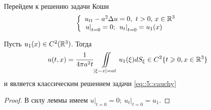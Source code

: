 \documentclass[../main.tex]{subfiles}
\begin{document}
Перейдем к решению задачи Коши
\begin{equation}
\left\{
  \begin{array}{ll}
  u_{tt}-a^2\Delta u=0,\ t>0,\, x\in \mathbb{R}^3\\
  \left. u\right|_{t=0}=0;\ \left. u_t\right|_{t=0}=u_1(x)
  \end{array}
\right.
\label{eq::5::cauchy}
\end{equation}
\begin{theorem}
Пусть $u_1(x)\in C^2(\mathbb{R}^3)$. Тогда 
\[
u(t,x)=\frac{1}{4\pi a^2t}\iint\limits_{|\xi - x|=at}u_1(\xi )dS_{\xi}\in C^2\{t\geqslant 0, x\in \mathbb{R}^3 \}
\]
и является классическим решением задачи \eqref{eq::5::cauchy}
\end{theorem}
\begin{proof}
В силу леммы имеем $\left. u\right|_{t=0}=0;\ \left. u_t\right|_{t=0}=u_1$.


\end{proof}
\end{document}
